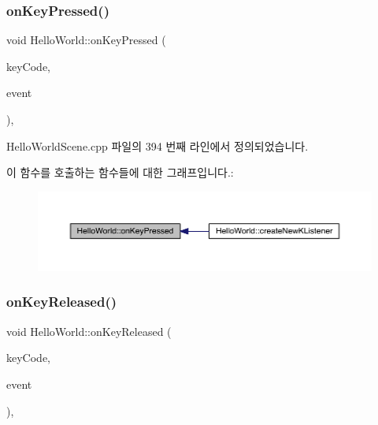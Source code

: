 \mbox{\label{class_hello_world_af2d5a509259a5d0fce7770a38df371d3}} 
\subsubsection{\texorpdfstring{on\+Key\+Pressed()}{onKeyPressed()}}
{\footnotesize\ttfamily void Hello\+World\+::on\+Key\+Pressed (\begin{DoxyParamCaption}\item[{\hyperlink{_hello_world_scene_8cpp_a29d93764040e709187aa17656a43405d}{cocos2d\+::\+Event\+Keyboard\+::\+Key\+Code}}]{key\+Code,  }\item[{cocos2d\+::\+Event $\ast$}]{event }\end{DoxyParamCaption})\hspace{0.3cm}{\ttfamily [protected]}, {\ttfamily [virtual]}}



Hello\+World\+Scene.\+cpp 파일의 394 번째 라인에서 정의되었습니다.

이 함수를 호출하는 함수들에 대한 그래프입니다.\+:
\nopagebreak
\begin{figure}[H]
\begin{center}
\leavevmode
\includegraphics[width=350pt]{class_hello_world_af2d5a509259a5d0fce7770a38df371d3_icgraph}
\end{center}
\end{figure}
\mbox{\label{class_hello_world_acb7b8934f4697e752182a650a1dc7c3a}} 
\subsubsection{\texorpdfstring{on\+Key\+Released()}{onKeyReleased()}}
{\footnotesize\ttfamily void Hello\+World\+::on\+Key\+Released (\begin{DoxyParamCaption}\item[{\hyperlink{_hello_world_scene_8cpp_a29d93764040e709187aa17656a43405d}{cocos2d\+::\+Event\+Keyboard\+::\+Key\+Code}}]{key\+Code,  }\item[{cocos2d\+::\+Event $\ast$}]{event }\end{DoxyParamCaption})\hspace{0.3cm}{\ttfamily [protected]}, {\ttfamily [virtual]}}



